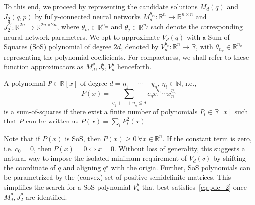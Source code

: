 To this end, we proceed by representing the candidate solutions $M_d(q)$ and
$J_2(q,p)$ by fully-connected neural networks $M_d^{\theta_m}: \mathbb{R}^n \to
\mathbb{R}^{n \times n}$ and $J_2^{\theta_j}: \mathbb{R}^{2n} \to \mathbb{R}^{2n
\times 2n}$, where $\theta_m \in \mathbb{R}^{n_m}$ and $\theta_j \in
\mathbb{R}^{n_j}$ each denote the corresponding neural network parameters. 
%
%
We opt to approximate $V_d(q)$ with a Sum-of-Squares (SoS) polynomial of degree $2d$, denoted
by $V_d^{\theta_v}: \mathbb{R}^{n} \to \mathbb{R}$, with $\theta_{n_v} \in \mathbb{R}^{n_v}$
representing the polynomial coefficients. 
%
For compactness, we shall refer to these function approximators as
$M_d^\theta, J_2^\theta, V_d^\theta$ henceforth.

\begin{definition} \label{def:sos_poly}
    A polynomial $P \in \mathbb{R}[x]$ of degree $d = \eta_1 + \cdots +
    \eta_n$, $\eta_i \in \mathbb{N}$, i.e.,
    \begin{equation*}
      P(x) = \sum_{\eta_1 + \cdots + \eta_n \leq d} c_\eta x_1^{\eta_1}
             \cdots x_n^{\eta_n}
    \end{equation*}
    is a sum-of-squares if there exist a finite number of polynomials
    $P_i \in \mathbb{R}[x]$ such that $P$ can be written as
    $%
      P(x) = \sum_i P_i^2(x).
    $%
\end{definition}

\begin{remark}
    Note that if $P(x)$ is SoS, then $P(x) \geq 0\ \forall x \in \mathbb{R}^n$.
    If the constant term is zero, i.e. $c_0 = 0$, then $P(x) = 0 \iff x = 0$.
    Without loss of generality, this suggests a natural way to impose the
    isolated minimum requirement of $V_d(q)$ by shifting the coordinate of $q$
    and aligning $q^\star$ with the origin. Further, SoS polynomials can be
    parametrized by the (convex) set of positive semidefinite matrices. This
    simplifies the search for a SoS polynomial $V_d^{\theta}$ that best
    satisfies~\eqref{eq:pde_2} once $M_d^{\theta}, J_2^\theta$ are identified.
\end{remark}

